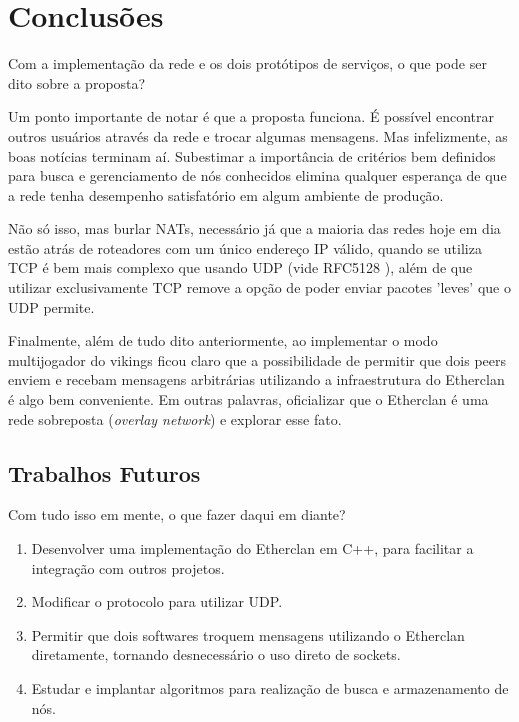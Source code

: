 \chapter{Conclusões}
\label{sec:conclusoes}

Com a implementação da rede e os dois protótipos de serviços, o que pode ser dito sobre a proposta?

Um ponto importante de notar é que a proposta funciona. É possível encontrar outros usuários
através da rede e trocar algumas mensagens. Mas infelizmente, as boas notícias terminam aí.
Subestimar a importância de critérios bem definidos para busca e gerenciamento de nós conhecidos
elimina qualquer esperança de que a rede tenha desempenho satisfatório em algum ambiente de
produção. 

Não só isso, mas burlar NATs, necessário já que a maioria das redes hoje em dia estão atrás de
roteadores com um único endereço IP válido, quando se utiliza TCP é bem mais complexo que usando
UDP (vide RFC5128 \cite{rfc5128}), além de que utilizar exclusivamente TCP remove a opção de poder
enviar pacotes 'leves' que o UDP permite.

Finalmente, além de tudo dito anteriormente, ao implementar o modo multijogador do vikings ficou
claro que a possibilidade de permitir que dois peers enviem e recebam mensagens arbitrárias
utilizando a infraestrutura do Etherclan é algo bem conveniente. Em outras palavras, oficializar
que o Etherclan é uma rede sobreposta (\textit{overlay network}) e explorar esse fato.

\section{Trabalhos Futuros}

  Com tudo isso em mente, o que fazer daqui em diante?

  \begin{enumerate}
    \item Desenvolver uma implementação do Etherclan em C++, para facilitar a integração com outros
      projetos.
    \item Modificar o protocolo para utilizar UDP.
    \item Permitir que dois softwares troquem mensagens utilizando o Etherclan diretamente, tornando
      desnecessário o uso direto de sockets.
    \item Estudar e implantar algoritmos para realização de busca e armazenamento de nós.
  \end{enumerate}